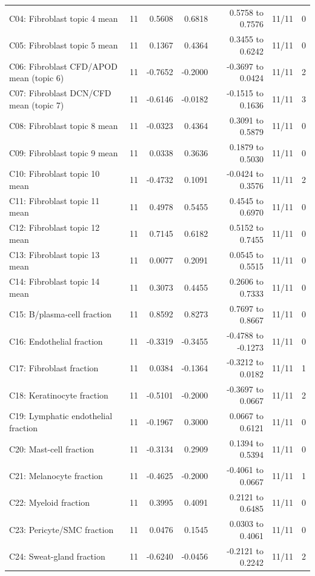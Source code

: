 {\begin{longtable}{@{}p{.29\linewidth}rrrrrr@{}}
C04: Fibroblast topic 4 mean & 11 & 0.5608 & 0.6818 & 0.5758 to 0.7576 & 11/11 & 0 \\
C05: Fibroblast topic 5 mean & 11 & 0.1367 & 0.4364 & 0.3455 to 0.6242 & 11/11 & 0 \\
C06: Fibroblast CFD/APOD mean (topic 6) & 11 & -0.7652 & -0.2000 & -0.3697 to 0.0424 & 11/11 & 2 \\
C07: Fibroblast DCN/CFD mean (topic 7) & 11 & -0.6146 & -0.0182 & -0.1515 to 0.1636 & 11/11 & 3 \\
C08: Fibroblast topic 8 mean & 11 & -0.0323 & 0.4364 & 0.3091 to 0.5879 & 11/11 & 0 \\
C09: Fibroblast topic 9 mean & 11 & 0.0338 & 0.3636 & 0.1879 to 0.5030 & 11/11 & 0 \\
C10: Fibroblast topic 10 mean & 11 & -0.4732 & 0.1091 & -0.0424 to 0.3576 & 11/11 & 2 \\
C11: Fibroblast topic 11 mean & 11 & 0.4978 & 0.5455 & 0.4545 to 0.6970 & 11/11 & 0 \\
C12: Fibroblast topic 12 mean & 11 & 0.7145 & 0.6182 & 0.5152 to 0.7455 & 11/11 & 0 \\
C13: Fibroblast topic 13 mean & 11 & 0.0077 & 0.2091 & 0.0545 to 0.5515 & 11/11 & 0 \\
C14: Fibroblast topic 14 mean & 11 & 0.3073 & 0.4455 & 0.2606 to 0.7333 & 11/11 & 0 \\
C15: B/plasma-cell fraction & 11 & 0.8592 & 0.8273 & 0.7697 to 0.8667 & 11/11 & 0 \\
C16: Endothelial fraction & 11 & -0.3319 & -0.3455 & -0.4788 to -0.1273 & 11/11 & 0 \\
C17: Fibroblast fraction & 11 & 0.0384 & -0.1364 & -0.3212 to 0.0182 & 11/11 & 1 \\
C18: Keratinocyte fraction & 11 & -0.5101 & -0.2000 & -0.3697 to 0.0667 & 11/11 & 2 \\
C19: Lymphatic endothelial fraction & 11 & -0.1967 & 0.3000 & 0.0667 to 0.6121 & 11/11 & 0 \\
C20: Mast-cell fraction & 11 & -0.3134 & 0.2909 & 0.1394 to 0.5394 & 11/11 & 0 \\
C21: Melanocyte fraction & 11 & -0.4625 & -0.2000 & -0.4061 to 0.0667 & 11/11 & 1 \\
C22: Myeloid fraction & 11 & 0.3995 & 0.4091 & 0.2121 to 0.6485 & 11/11 & 0 \\
C23: Pericyte/SMC fraction & 11 & 0.0476 & 0.1545 & 0.0303 to 0.4061 & 11/11 & 0 \\
C24: Sweat-gland fraction & 11 & -0.6240 & -0.0456 & -0.2121 to 0.2242 & 11/11 & 2 \\

\end{longtable}}
